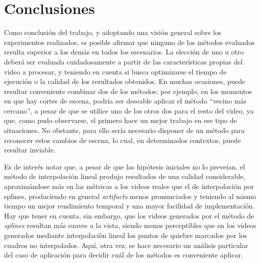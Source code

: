 \section{Conclusiones}

    Como conclusión del trabajo, y adoptando una visión general sobre los experimentos realizados, es posible afirmar que ninguno de los métodos evaluados resulta superior a los demás en todos los escenarios. La elección de uno u otro deberá ser evaluada cuidadosamente a partir de las características propias del video a procesar, y teniendo en cuenta si busca optimizarse el tiempo de ejecución o la calidad de los resultados obtenidos. En muchas ocasiones, puede resultar conveniente combinar dos de los métodos; por ejemplo, en los momentos en que hay cortes de escena, podría ser deseable aplicar el método ``vecino más cercano'', a pesar de que se utilice uno de los otros dos para el resto del video, ya que, como pudo observarse, el primero hace un mejor trabajo en ese tipo de situaciones. No obstante, para ello sería necesario disponer de un método para reconocer estos cambios de escena, lo cual, en determinados contextos, puede resultar inviable.

    Es de interés notar que, a pesar de que las hipótesis iniciales no lo preveían, el método de interpolación lineal produjo resultados de una calidad considerable, aproximándose más en las métricas a los videos reales que el de interpolación por splines, produciendo en general \emph{artifacts} menos pronunciados y teniendo al mismo tiempo un mejor rendimiento temporal y una mayor facilidad de implementación. Hay que tener en cuenta, sin embargo, que los videos generados por el método de \emph{splines} resultan más suaves a la vista, siendo menos perceptibles que en los videos generados mediante interpolación lineal los puntos de quiebre marcados por los cuadros no interpolados. Aquí, otra vez, se hace necesario un análisis particular del caso de aplicación para decidir cuál de los métodos es conveniente aplicar.
